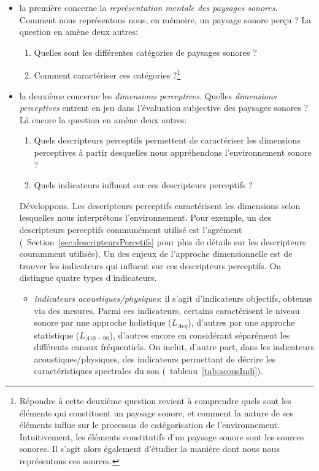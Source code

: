 \begin{itemize}
\item la première concerne la \emph{représentation mentale des paysages sonores}. Comment nous représentons nous, en mémoire, un paysage sonore perçu ? La question en amène deux autres:

\begin{enumerate}
\item Quelles sont les différentes catégories de paysages sonores ?
\item Comment caractériser ces catégories ?\footnote{Répondre à cette deuxième question revient à comprendre quels sont les éléments qui constituent un paysage sonore, et comment la nature de ses éléments influe sur le processus de catégorisation de l'environnement. Intuitivement, les éléments constitutifs d'un paysage sonore sont les sources sonores. Il s'agit alors également d'étudier la manière dont nous nous représentons ces sources.}
\end{enumerate}

\item la deuxième concerne les \emph{dimensions perceptives}.  Quelles \emph{dimensions perceptives} entrent en jeu dans l'évaluation subjective des paysages sonores ?  Là encore la question en amène deux autres:
\begin{enumerate}
\item Quels descripteurs perceptifs permettent de caractériser les dimensions perceptives à partir desquelles nous appréhendons l'environnement sonore ?
\item Quels indicateurs influent sur ces descripteurs perceptifs ?
\end{enumerate}

Développons. Les descripteurs perceptifs caractérisent les dimensions selon lesquelles nous interprétons l'environnement. Pour exemple, un des descripteurs perceptifs communément utilisé est l'agrément (\cf~Section~\ref{sec:descripteursPercetifs} pour plus de détails sur les descripteurs couramment utilisés). 
Un des enjeux de l'approche dimensionnelle est de trouver les indicateurs qui influent sur ces descripteurs perceptifs. On distingue quatre types d'indicateurs.

\begin{itemize}
\item \emph{indicateurs acoustiques/physiques}: il s'agit d'indicateurs objectifs, obtenus via des mesures. Parmi ces indicateurs, certains caractérisent le niveau sonore par une approche holistique ($L_{Aeq}$), d'autres par une approche statistique ($L_{A10-90}$), d'autres encore en considérant séparément les différents canaux fréquentiels. On inclut, d'autre part, dans les indicateurs acoustiques/physiques, des indicateurs permettant de décrire les caractéristiques spectrales du son (\cf~tableau~\ref{tab:acousIndi}).


\end{itemize}
\end{itemize}
